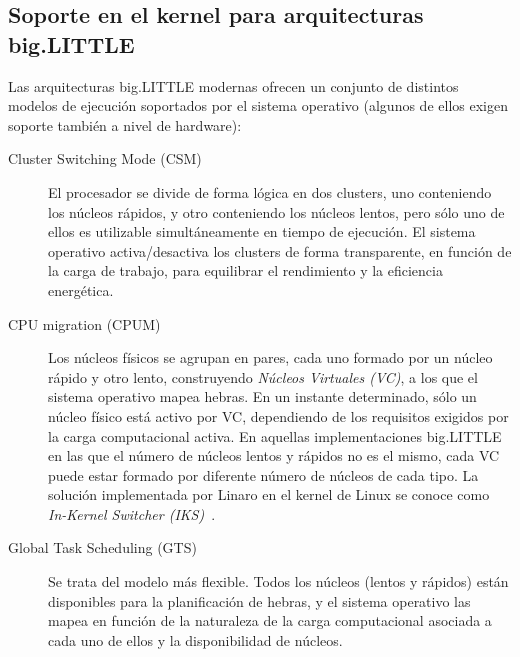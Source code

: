 \subsection{Soporte en el kernel para arquitecturas big.LITTLE}
\label{sec:models}

Las arquitecturas big.LITTLE modernas ofrecen un conjunto de distintos modelos de ejecución
soportados por el sistema operativo (algunos de ellos exigen soporte también a nivel de
hardware):

\begin{description}

	\item[Cluster Switching Mode (CSM)]

El procesador se divide de forma lógica en dos clusters, uno conteniendo los núcleos
rápidos, y otro conteniendo los núcleos lentos, pero sólo uno de ellos es utilizable
simultáneamente en tiempo de ejecución. El sistema operativo activa/desactiva los 
clusters de forma transparente, en función de la carga de trabajo, para equilibrar
el rendimiento y la eficiencia energética.

	\item[CPU migration (CPUM)]

Los núcleos físicos se agrupan en pares, cada uno formado por un núcleo rápido y otro
lento, construyendo {\em Núcleos Virtuales (VC)}, a los que el sistema operativo mapea
hebras. En un instante determinado, sólo un núcleo físico está activo por VC, dependiendo
de los requisitos exigidos por la carga computacional activa. En aquellas implementaciones
big.LITTLE en las que el número de núcleos lentos y rápidos no es el mismo, cada VC puede
estar formado por diferente número de núcleos de cada tipo. La solución implementada
por Linaro en el kernel de Linux se conoce como {\em In-Kernel Switcher (IKS)}~\cite{}.

	\item[Global Task Scheduling (GTS)]

Se trata del modelo más flexible. Todos los núcleos (lentos y rápidos) están disponibles
para la planificación de hebras, y el sistema operativo las mapea en función de la naturaleza
de la carga computacional asociada a cada uno de ellos y la disponibilidad de núcleos. 

\end{description}

